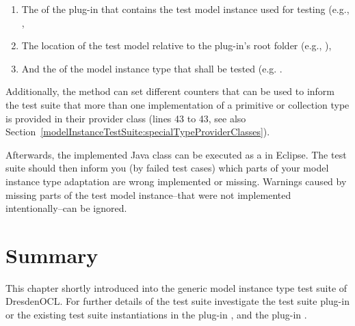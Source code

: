 \begin{enumerate}
	\item The  of the plug-in that contains the test model instance used 
	  for testing (e.g.,
	  ,
	\item The location of the test model relative to the plug-in's root folder 
	  (e.g.,
	  ),
	\item And the  of the model instance type that shall be tested (e.g.
	  .
\end{enumerate}

Additionally, the method can set different counters that can be used to inform
the test suite that more than one implementation of a primitive or collection
type is provided in their provider class (lines 43 to 43, see also 
Section~\ref{modelInstanceTestSuite:specialTypeProviderClasses}).

Afterwards, the implemented Java class can be executed as a  in Eclipse. The test suite should then inform you (by failed test 
cases) which parts of your model instance type adaptation are wrong implemented
or missing. Warnings caused by missing parts of the test model instance--that 
were not implemented intentionally--can be ignored.


\section{Summary}

This chapter shortly introduced into the generic model instance type test suite
of DresdenOCL. For further details of the test suite investigate the test suite
plug-in
or the existing test suite instantiations in the plug-in 
, and the plug-in .
